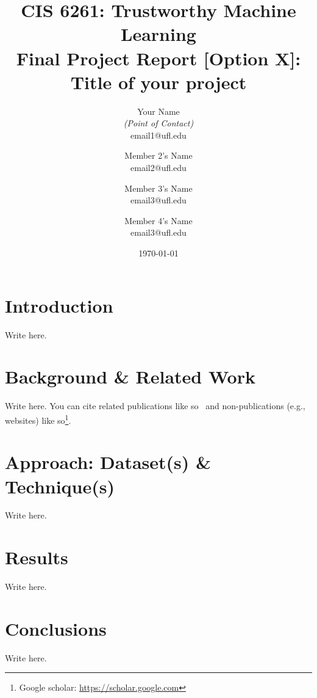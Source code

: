\documentclass[11pt,letterpaper]{article}
\title{CIS 6261: Trustworthy Machine Learning\\
	\large Final Project Report [Option X]: Title of your project} %
\author{
        Your Name \\{\em (Point of Contact)} \\
        email1@ufl.edu\\
        \and
        Member 2's Name \\
        email2@ufl.edu\\
        \and
        Member 3's Name \\
        email3@ufl.edu\\
        \and
        Member 4's Name \\
        email3@ufl.edu\\
}
\date{\today}
\begin{document}

\maketitle







\section{Introduction}

Write here.


\section{Background \& Related Work}

Write here. You can cite related publications like so~\cite{vapnik1994measuring} and non-publications (e.g., websites) like so\footnote{Google scholar: \url{https://scholar.google.com}}.


\section{Approach: Dataset(s) \& Technique(s)}

Write here. 

\section{Results}

Write here. 


\section{Conclusions}

Write here. 




\end{document}
